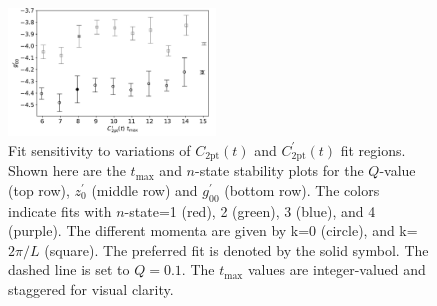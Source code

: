 \documentclass[prd,aps,twocolumn,superscriptaddress,tightenlines,nofootinbib,floatfix,preprintnumbers,10pt]{revtex4-1}
\begin{document}
\begin{figure}[h]
{		\includegraphics[width=0.49\textwidth]{plots/figures/3296_d2pt_tmax_dgV.pdf}
		\caption{Fit sensitivity to variations of $C_{\mathrm{2pt}}(t)$ and $C^\prime_{\mathrm{2pt}}(t)$ fit regions. Shown here are the $t_{\mathrm{max}}$ and $n$-state stability plots for the $Q$-value (top row), $z^\prime_0$ (middle row) and $g^\prime_{00}$ (bottom row). The colors indicate fits with $n$-state=1 (red), 2 (green), 3 (blue), and 4 (purple). The different momenta are given by k=0 (circle), and k=$2\pi/L$ (square). The preferred fit is denoted by the solid symbol. The dashed line is set to $Q=0.1$. The $t_{\mathrm{max}}$ values are integer-valued and staggered for visual clarity.}
		\label{fig:stability_c2pt}
}\end{figure}
\end{document}
